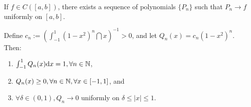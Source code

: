 \begin{theorem}
    If $f \in C([a,b])$, there exists a sequence of polynomials $\{ P_n\}$ such that $P_n \to f$ uniformly on $[a,b]$.
\end{theorem}

\begin{theorem}
    Define $c_n := (\int_{-1}^1 (1 - x^2)^n \dint x)^{-1} > 0$, and let $Q_n(x) = c_n(1 - x^2)^n$. Then:
    \begin{enumerate}
        \item $\int_{-1}^1 Q_n(x) \text{d} x = 1, \forall n \in \mathbb{N}$,
        \item $Q_n(x) \geq 0, \forall n \in \mathbb{N}, \forall x \in [-1, 1]$, and
        \item $\forall \delta \in (0,1), Q_n \to 0$ uniformly on $\delta \leq |x| \leq 1$.
    \end{enumerate}
\end{theorem}

